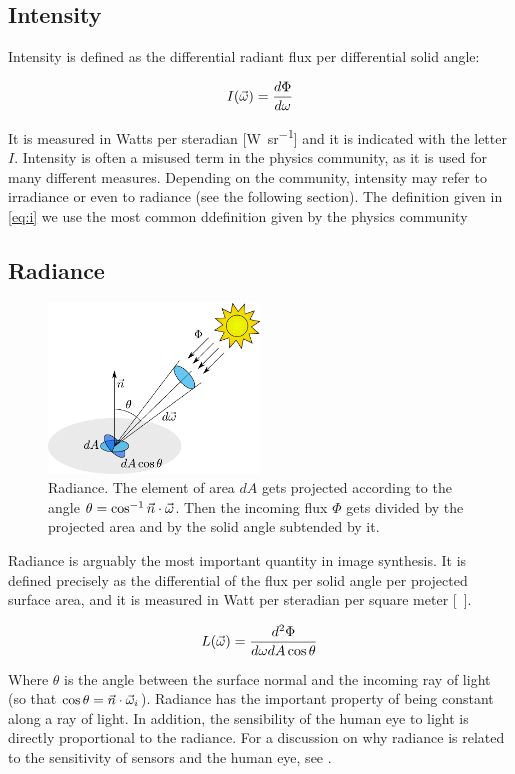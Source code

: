 \subsection{Intensity}
Intensity is defined as the differential radiant flux per differential solid angle:

$$
I(\vec{\omega}) = \frac{d \Phi}{d \omega}
\label{eq:i}
$$

It is measured in Watts per steradian [\si{\watt\per\steradian}] and it is indicated with the letter $I$. Intensity is often a misused term in the physics community, as it is used for many different measures. Depending on the community, intensity may refer to irradiance or even to radiance (see the following section). The definition given in \ref{eq:i} we use the most common ddefinition given by the physics community

\subsection{Radiance}

\begin{figure}[!ht]
\centering
\includegraphics[width=0.5\textwidth]{images/radiance.pdf}
\caption{Radiance. The element of area $dA$ gets projected according to the angle $\theta = \cos^{-1}{\vec{n} \cdot \vec{\omega}}$. Then the incoming flux $\Phi$ gets divided by the projected area and by the solid angle subtended by it.}
\label{fig:radiance}
\end{figure}


Radiance is arguably the most important quantity in image synthesis. It is defined precisely as the differential of the flux per solid angle per projected surface area, and it is measured in Watt per steradian per square meter [\si{\watt\per\steradian\meter\square}].

$$
L(\vec{\omega}) = \frac{d^2 \Phi}{d\omega dA \cos \theta}
$$

Where $\theta$ is the angle between the surface normal and the incoming ray of light (so that $\cos\theta = \vec{n} \cdot \vec{\omega}_i$). Radiance has the important property of being constant along a ray of light. In addition, the sensibility of the human eye to light is directly proportional to the radiance. For a discussion on why radiance is related to the sensitivity of sensors and the human eye, see \cite{Cohen:1993:RRI:154731}.

